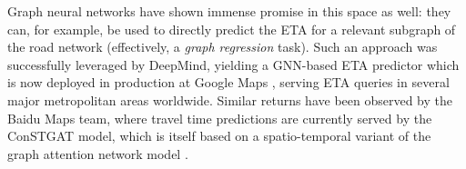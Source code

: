 Graph neural networks have shown immense promise in this space as well: they can, for example, be used to directly predict the ETA for a relevant subgraph of the road network (effectively, a \emph{graph regression} task). Such an approach was successfully leveraged by DeepMind, yielding a GNN-based ETA predictor which is now deployed in production at Google Maps \citep{derrowpinion2021traffic}, serving ETA queries in several major metropolitan areas worldwide. Similar returns have been observed by the Baidu Maps team, where travel time predictions are currently served by the ConSTGAT model, which is itself based on a spatio-temporal variant of the graph attention network model \citep{fang2020constgat}.

